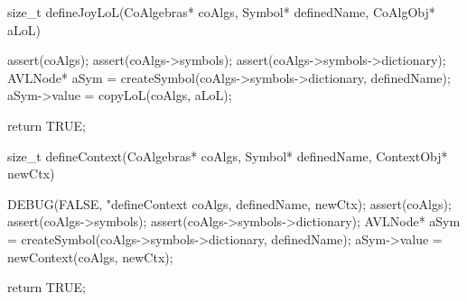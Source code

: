 size_t defineJoyLoL(CoAlgebras* coAlgs,
                    Symbol* definedName,
                    CoAlgObj* aLoL) {
  assert(coAlgs);
  assert(coAlgs->symbols);
  assert(coAlgs->symbols->dictionary);
  AVLNode* aSym =
    createSymbol(coAlgs->symbols->dictionary, definedName);
  aSym->value = copyLoL(coAlgs, aLoL);

  return TRUE;
}

size_t defineContext(CoAlgebras* coAlgs,
                     Symbol* definedName,
                     ContextObj* newCtx) {
  DEBUG(FALSE, "defineContext %
        coAlgs, definedName, newCtx);
  assert(coAlgs);
  assert(coAlgs->symbols);
  assert(coAlgs->symbols->dictionary);
  AVLNode* aSym =
    createSymbol(coAlgs->symbols->dictionary, definedName);
  aSym->value   = newContext(coAlgs, newCtx);

  return TRUE;
}
\stoptyping